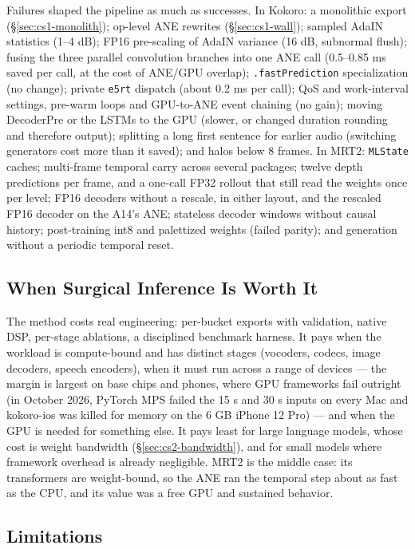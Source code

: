 \documentclass[11pt]{article}
\newcommand{\code}[1]{\texttt{#1}}
\begin{document}
Failures shaped the pipeline as much as successes. In Kokoro: a monolithic export (\S\ref{sec:cs1-monolith}); op-level ANE rewrites (\S\ref{sec:cs1-wall}); sampled AdaIN statistics (1--4 dB); FP16 pre-scaling of AdaIN variance (16 dB, subnormal flush); fusing the three parallel convolution branches into one ANE call (0.5--0.85 ms saved per call, at the cost of ANE/GPU overlap); \code{.fastPrediction} specialization (no change); private \code{e5rt} dispatch (about 0.2 ms per call); QoS and work-interval settings, pre-warm loops and GPU-to-ANE event chaining (no gain); moving DecoderPre or the LSTMs to the GPU (slower, or changed duration rounding and therefore output); splitting a long first sentence for earlier audio (switching generators cost more than it saved); and halos below 8 frames. In MRT2: \code{MLState} caches; multi-frame temporal carry across several packages; twelve depth predictions per frame, and a one-call FP32 rollout that still read the weights once per level; FP16 decoders without a rescale, in either layout, and the rescaled FP16 decoder on the A14's ANE; stateless decoder windows without causal history; post-training int8 and palettized weights (failed parity); and generation without a periodic temporal reset.

\subsection{When Surgical Inference Is Worth It}\label{sec:disc-worth}

The method costs real engineering: per-bucket exports with validation, native DSP, per-stage ablations, a disciplined benchmark harness. It pays when the workload is compute-bound and has distinct stages (vocoders, codecs, image decoders, speech encoders), when it must run across a range of devices --- the margin is largest on base chips and phones, where GPU frameworks fail outright (in October 2026, PyTorch MPS failed the 15 s and 30 s inputs on every Mac and kokoro-ios was killed for memory on the 6 GB iPhone 12 Pro) --- and when the GPU is needed for something else. It pays least for large language models, whose cost is weight bandwidth (\S\ref{sec:cs2-bandwidth}), and for small models where framework overhead is already negligible. MRT2 is the middle case: its transformers are weight-bound, so the ANE ran the temporal step about as fast as the CPU, and its value was a free GPU and sustained behavior.

\subsection{Limitations}\label{sec:disc-limitations}
\end{document}
